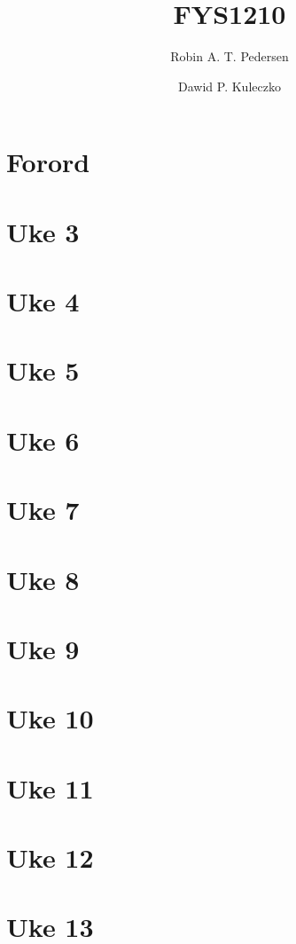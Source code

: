 \documentclass{article}
\begin{document}
  \title{FYS1210}
  \author{Robin A. T. Pedersen \and Dawid P. Kuleczko}
  \maketitle
  \tableofcontents

  \section{Forord}
    

  \section{Uke 3}
    

  \section{Uke 4}
    

  \section{Uke 5}
  \section{Uke 6}
  \section{Uke 7}
  \section{Uke 8}
  \section{Uke 9}
  \section{Uke 10}
  \section{Uke 11}
  \section{Uke 12}
  \section{Uke 13}
\end{document}
